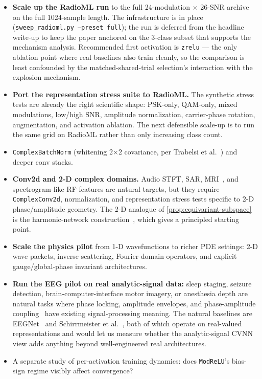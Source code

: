 \documentclass{article}
\providecommand{\Cref}[1]{\autoref{#1}}
\newcommand{\code}[1]{\texttt{#1}}
\begin{document}
\begin{itemize}
  \item \textbf{Scale up the RadioML run} to the full
    24-modulation $\times$ 26-SNR archive on the full 1024-sample
    length. The infrastructure is in place
    (\code{sweep\_radioml.py --preset full}); the run is deferred from
    the headline write-up to keep the paper anchored on the 3-class
    subset that supports the mechanism analysis. Recommended first
    activation is \code{zrelu} --- the only ablation point where real
    baselines also train cleanly, so the comparison is least confounded
    by the matched-shared-trial selection's interaction with the
    explosion mechanism.
  \item \textbf{Port the representation stress suite to RadioML.}
    The synthetic stress tests are already the right scientific shape:
    PSK-only, QAM-only, mixed modulations, low/high SNR, amplitude
    normalization, carrier-phase rotation, augmentation, and activation
    ablation. The next defensible scale-up is to run the same grid on
    RadioML rather than only increasing class count.
  \item \code{ComplexBatchNorm} (whitening 2$\times$2 covariance, per
    Trabelsi et al.~\cite{trabelsi2018deep}) and deeper conv stacks.
  \item \textbf{Conv2d and 2-D complex domains.} Audio STFT, SAR,
    MRI~\cite{cole2021analysis,virtue2017better}, and spectrogram-like
    RF features are natural targets, but they require
    \code{ComplexConv2d}, normalization, and representation stress
    tests specific to 2-D phase/amplitude geometry. The 2-D analogue
    of \Cref{prop:equivariant-subspace} is the harmonic-network
    construction~\cite{worrall2017harmonic}, which gives a principled
    starting point.
  \item \textbf{Scale the physics pilot} from 1-D wavefunctions to
    richer PDE settings: 2-D wave packets, inverse scattering,
    Fourier-domain operators, and explicit gauge/global-phase
    invariant architectures.
  \item \textbf{Run the EEG pilot on real analytic-signal data:}
    sleep staging, seizure detection, brain-computer-interface motor
    imagery, or anesthesia depth are natural tasks where phase
    locking, amplitude envelopes, and phase-amplitude
    coupling~\cite{tort2010measuring} have existing signal-processing
    meaning. The natural baselines are
    EEGNet~\cite{lawhern2018eegnet} and
    Schirrmeister et al.~\cite{schirrmeister2017deep}, both of which
    operate on real-valued representations and would let us measure
    whether the analytic-signal CVNN view adds anything beyond
    well-engineered real architectures.
  \item A separate study of per-activation training dynamics: does
    \code{ModReLU}'s bias-sign regime visibly affect convergence?
\end{itemize}
\end{document}
